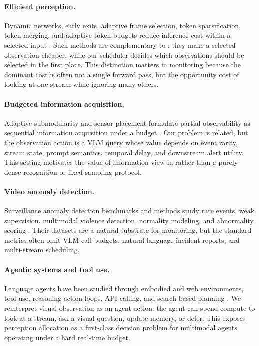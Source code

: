 \paragraph{Efficient perception.}
Dynamic networks, early exits, adaptive frame selection, token sparsification, token merging, and adaptive token budgets reduce inference cost within a selected input \citep{figurnov2017spatially,huang2018msdnet,wang2018skipnet,wu2019adaframe,rao2021dynamicvit,meng2022evit,yin2022avit,ryoo2021tokenlearner,bolya2023tome}. Such methods are complementary to \method: they make a selected observation cheaper, while our scheduler decides which observations should be selected in the first place. This distinction matters in monitoring because the dominant cost is often not a single forward pass, but the opportunity cost of looking at one stream while ignoring many others.

\paragraph{Budgeted information acquisition.}
Adaptive submodularity and sensor placement formulate partial observability as sequential information acquisition under a budget \citep{krause2008sensor,golovin2011adaptive}. Our problem is related, but the observation action is a VLM query whose value depends on event rarity, stream state, prompt semantics, temporal delay, and downstream alert utility. This setting motivates the value-of-information view in \method rather than a purely dense-recognition or fixed-sampling protocol.

\paragraph{Video anomaly detection.}
Surveillance anomaly detection benchmarks and methods study rare events, weak supervision, multimodal violence detection, normality modeling, and abnormality scoring \citep{hasan2016regularity,delgiorno2016discriminative,luo2017revisit,sultani2018ucfcrime,liu2018futureframe,park2020memoryguided,wu2020xdviolence,georgescu2021selfsupervised,tian2021rtfm,feng2021mist}. Their datasets are a natural substrate for monitoring, but the standard metrics often omit VLM-call budgets, natural-language incident reports, and multi-stream scheduling.

\paragraph{Agentic systems and tool use.}
Language agents have been studied through embodied and web environments, tool use, reasoning-action loops, API calling, and search-based planning \citep{shridhar2021alfworld,yao2022webshop,yao2023react,schick2023toolformer,yao2023tot,deng2023mind2web,qin2024toolllm,liu2024agentbench,zhou2024webarena}. We reinterpret visual observation as an agent action: the agent can spend compute to look at a stream, ask a visual question, update memory, or defer. This exposes perception allocation as a first-class decision problem for multimodal agents operating under a hard real-time budget.
